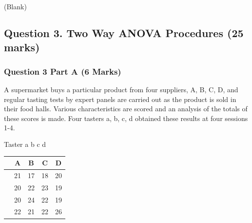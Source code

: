 \documentclass[a4paper,12pt]{article}
\begin{document}
	
	\newpage
	(Blank)
	\newpage
\subsection*{Question 3. Two Way ANOVA Procedures (25 marks) }
\subsubsection*{Question 3 Part A (6 Marks)}
 A supermarket buys a particular product from four suppliers, A, B, C, D, and regular tasting tests by expert panels 
are carried out as the product is sold in their food halls. 
Various characteristics are scored and an analysis of the totals of these scores is made. 
Four tasters a, b, c, d obtained these results at four sessions 1-4.

Taster a b c d
\begin{tabular}{|c|c|c|c|c|}\hline 
&	A  & B  & C & D \\ \hline
	\hline  
	
&   21 & 17 & 18 & 20 \\
	
&	20 & 22 & 23 & 19 \\
	
&	20 & 24 & 22 & 19 \\
	
&	22 & 21 & 22 & 26 \\
	
	\hline 
\end{tabular} 
\end{document}
